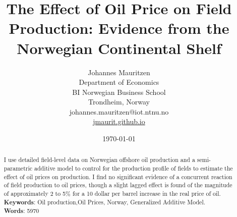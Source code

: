 \documentclass[12pt]{article}
\title{The Effect of Oil Price on Field Production: Evidence from the Norwegian Continental Shelf}
\author{Johannes Mauritzen\\
		Department of Economics\\
        BI Norwegian Business School\\
        Trondheim, Norway\\
        johannes.mauritzen@iot.ntnu.no\\
        \url{jmaurit.github.io}\\
		}
\date{\today}
\begin{document}
	\maketitle

\begin{abstract}
I use detailed field-level data on Norwegian offshore oil production and a semi-parametric additive model to control for the production profile of fields to estimate the effect of oil prices on production.  I find no significant evidence of a concurrent reaction of field production to oil prices, though a slight lagged effect is found of the magnitude of approximately 2 to 5\% for a 10 dollar per barrel increase in the real price of oil.\\
\textbf{Keywords}: Oil production,Oil Prices, Norway, Generalized Additive Model.\\
\textbf{Words}: 5970
\end{abstract}
\end{document}

